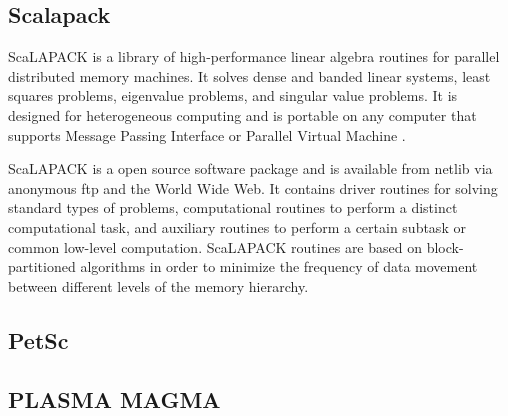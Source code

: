 \subsection{Scalapack}

    ScaLAPACK is a library of high-performance linear algebra routines for
    parallel distributed memory machines. It solves dense and banded
    linear systems, least squares problems, eigenvalue problems, and
    singular value problems. It is designed for heterogeneous computing
    and is portable on any computer that supports Message Passing
    Interface or Parallel Virtual Machine \cite{www-scalapack}.

    ScaLAPACK is a open source software package and is available from
    netlib via anonymous ftp and the World Wide Web. It contains driver
    routines for solving standard types of problems, computational
    routines to perform a distinct computational task, and auxiliary
    routines to perform a certain subtask or common low-level
    computation. ScaLAPACK routines are based on block-partitioned
    algorithms in order to minimize the frequency of data movement between
    different levels of the memory hierarchy.
    
\subsection{PetSc}

\pv

\subsection{PLASMA MAGMA}

